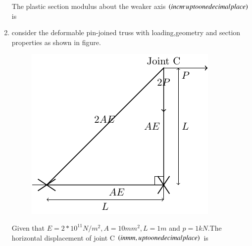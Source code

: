 \documentclass[journal,12pt,twocolumn]{IEEEtran}
\theoremstyle{remark}
\begin{document}
\begin{enumerate}
 The plastic section modulus about the weaker axis $\left(in cm^,up to one decimal place\right)$ is\\
 \item consider the deformable pin-joined truss with loading,geometry and section properties as shown in figure.\\
\begin{figure}[h!]
  
        \centering
        \includegraphics[width=0.7\linewidth]{figure/fig2/fig2.pdf}
		\caption{}
        \label{stemplot}
\end{figure}


 Given that $E = 2 * 10^{11} N/m^{2},A=10 mm^{2},L=1 m$ and $p=1 kN$.The horizontal displacement of joint C $\left(in mm,up to one decimal place\right)$ is\\


\end{enumerate}
\end{document}
